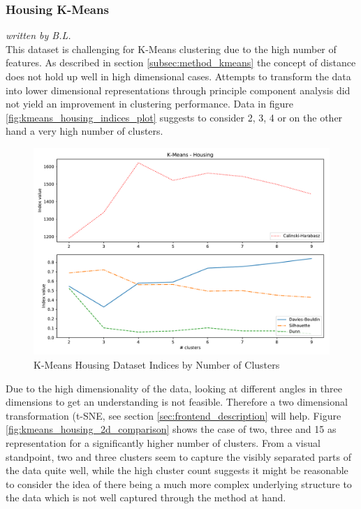 
\subsubsection{Housing K-Means}
\textit{written by B.L.}\\

This dataset is challenging for K-Means clustering due to the high number of features. As described in section \ref{subsec:method_kmeans} the concept of distance does not hold up well in high dimensional cases. Attempts to transform the data into lower dimensional representations through principle component analysis did not yield an improvement in clustering performance. Data in figure \ref{fig:kmeans_housing_indices_plot} suggests to consider 2, 3, 4 or on the other hand a very high number of clusters.

\begin{figure}[h]
\caption{K-Means Housing Dataset Indices by Number of Clusters}
\begin{center}
\includegraphics[width=1.0\textwidth]{images/kmeans_housing_index_plot.pdf}
\end{center}
\label{fig:kmeans_housing_comparison_plot}
\end{figure}

Due to the high dimensionality of the data, looking at different angles in three dimensions to get an understanding is not feasible. Therefore a two dimensional transformation (t-SNE, see section \ref{sec:frontend_description} will help. Figure \ref{fig:kmeans_housing_2d_comparison} shows the case of two, three and 15 as representation for a significantly higher number of clusters. From a visual standpoint, two and three clusters seem to capture the visibly separated parts of the data quite well, while the high cluster count suggests it might be reasonable to consider the idea of there being a much more complex underlying structure to the data which is not well captured through the method at hand.

